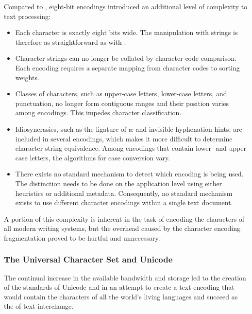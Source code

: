 \documentclass{book}
\begin{document}

Compared to , eight-bit encodings introduced an additional level
of complexity to text processing:
\begin{itemize}
  \item Each character is exactly eight bits wide. The manipulation with strings
    is therefore as straightforward as with .
  \item Character strings can no longer be collated by character code
    comparison. Each encoding requires a separate mapping from character codes
    to sorting weights.
  \item Classes of characters, such as upper-case letters, lower-case letters,
    and punctuation, no longer form contiguous ranges and their position varies
    among encodings. This impedes character classification.
  \item Idiosyncrasies, such as the ligature of æ and invisible hyphenation
    hints, are included in several encodings, which makes it more difficult to
    determine character string equivalence. Among encodings that contain lower-
    and upper-case letters, the algorithms for case conversion vary.
  \item There exists no standard mechanism to detect which encoding is being
    used. The distinction needs to be done on the application level using either
    heuristics or additional metadata. Consequently, no standard mechanism
    exists to use different character encodings within a single text document.
\end{itemize}
A portion of this complexity is inherent in the task of encoding the characters
of all modern writing systems, but the overhead caused by the character encoding
fragmentation proved to be hurtful and unnecessary.

\subsubsection{The Universal Character Set and Unicode}
The continual increase in the available bandwidth and storage led to the
creation of the standards of Unicode \cite{unicode91,unicode92} and
 in an attempt to create a text encoding that would
contain the characters of all the world's living languages and succeed
 as the  of text interchange.
\end{document}
